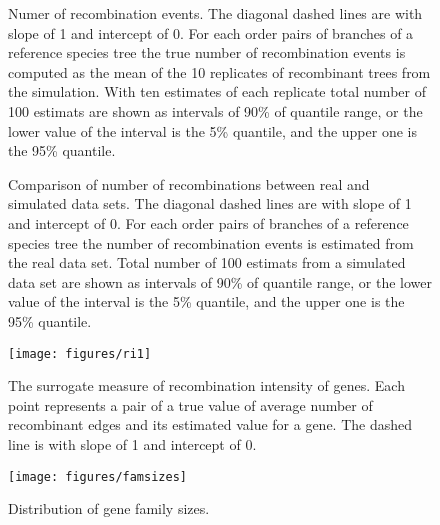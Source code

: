 \documentclass[english]{article}
\begin{document}
\begin{figure}
\caption{\label{fig:h1}Numer of recombination events. The diagonal dashed
lines are with slope of 1 and intercept of 0. For each order
pairs of branches of a reference species tree the true number of recombination
events is computed as the mean of the 10 replicates of recombinant
trees from the simulation. With ten estimates of each replicate total
number of 100 estimats are shown as intervals of 90\% of quantile
range, or the lower value of the interval is the 5\% quantile, and
the upper one is the 95\% quantile. }
\end{figure}
\clearpage{}%

\begin{figure}


\caption{\label{fig:h2}Comparison of number of recombinations between real
and simulated data sets. The diagonal dashed lines are with
slope of 1 and intercept of 0. For each order pairs of branches of
a reference species tree the number of recombination events is estimated
from the real data set. Total number of 100 estimats from a simulated
data set are shown as intervals of 90\% of quantile range, or the
lower value of the interval is the 5\% quantile, and the upper one
is the 95\% quantile. }
\end{figure}
\clearpage{}%


\begin{figure}
\texttt{[image: figures/ri1]}
\caption{\label{fig:ri1}The surrogate measure of recombination intensity
of genes. Each point represents a pair of a true value of average number of
recombinant edges and its estimated value for a gene. The dashed line is with
slope of 1 and intercept of 0.}
\end{figure}
\clearpage{}%




\begin{figure}
\begin{center}
\texttt{[image: figures/famsizes]}
\end{center}
\vspace{-.3in}
\caption{Distribution of gene family sizes.}
\label{fig:famsize}
\end{figure}
\end{document}
